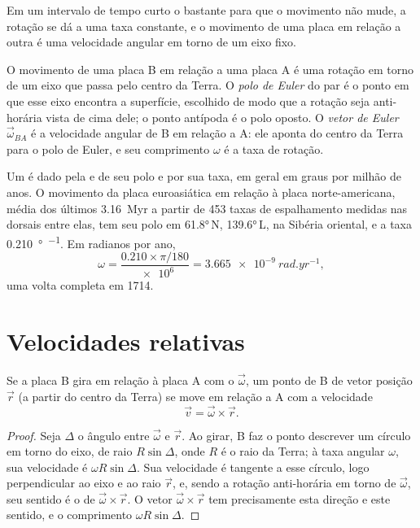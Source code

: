 Em um intervalo de tempo curto o bastante para que o movimento não mude, a
rotação se dá a uma taxa constante, e o movimento de uma placa em relação a
outra é uma velocidade angular em torno de um eixo fixo.

\begin{definition}\label{def:b1:plate-kinematics:euler-pole}
O movimento de uma placa B em relação a uma placa A é uma rotação em torno de um eixo
que passa pelo centro da Terra. O \emph{polo de Euler} do par é o ponto em que esse eixo encontra a superfície, escolhido de modo que a
rotação seja anti-horária vista de cima dele; o ponto antípoda é o
polo oposto. O \emph{vetor de Euler}
$\vec\omega_{BA}$ é a velocidade angular de B em relação a A: ele aponta do centro da Terra para o polo de Euler, e seu comprimento $\omega$ é a
taxa de rotação.
\end{definition}

Um  é dado pela  e  de seu polo e por sua
taxa, em geral em graus por milhão de anos. O movimento da placa euroasiática
em relação à placa norte-americana, média dos últimos \qty{3.16}{Myr}
a partir de 453 taxas de espalhamento medidas nas dorsais entre elas, tem seu polo em
\ang{61.8}\,N, \ang{139.6}\,L, na Sibéria oriental, e a taxa
\qty{0.210}{\degree\per\Myr}. Em radianos por ano,
\[
  \omega = \frac{0.210\times\pi/180}{\num{e6}} = \qty{3.665e-9}{rad.yr^{-1}},
\]
uma volta completa em \qty{1714}{\Myr}.

\section{Velocidades relativas}

\begin{theorem}\label{thm:b1:plate-kinematics:velocity}
Se a placa B gira em relação à placa A com o  $\vec\omega$, um ponto
de B de vetor posição $\vec r$ (a partir do centro da Terra) se move
em relação a A com a velocidade
\[
  \vec v = \vec\omega\times\vec r .
\]
\end{theorem}

\begin{proof}
Seja $\Delta$ o ângulo entre $\vec\omega$ e $\vec r$. Ao girar, B faz o ponto descrever um círculo em torno do eixo, de raio $R\sin\Delta$, onde $R$ é o raio da Terra; à taxa angular $\omega$, sua velocidade é
$\omega R\sin\Delta$. Sua velocidade é tangente a esse círculo, logo perpendicular ao eixo e ao raio $\vec r$, e, sendo a rotação anti-horária em torno de $\vec\omega$, seu sentido é o de $\vec\omega\times\vec r$.
O vetor $\vec\omega\times\vec r$ tem precisamente esta direção e este sentido, e
o comprimento $\omega R\sin\Delta$.
\end{proof}

